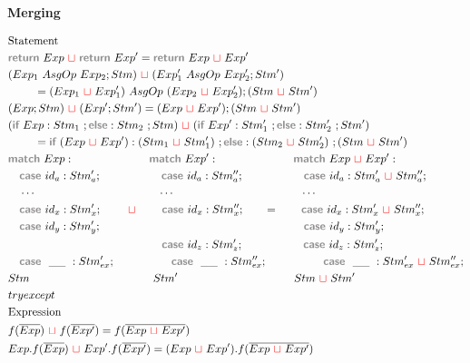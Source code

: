 \documentclass[11pt]{jarticle}
\newcommand{\gray}[1]{\textbf{\textsf{\color{Gray}#1}}}
\newcommand{\mg}{~{\color{red}{\sqcup}}~} %
\begin{document}
{\bf Merging}

\begin{align*}
  & \text{Statement}\\
  & \gray{return}~Exp \mg \gray{return}~Exp' = \gray{return}~Exp \mg Exp'\\
  & (Exp_1 ~AsgOp~ Exp_2 ; Stm) \mg (Exp'_1 ~AsgOp~ Exp'_2 ; Stm')\\
  & ~~~~~~~ = (Exp_1 \mg Exp'_1) ~AsgOp~ (Exp_2 \mg Exp'_2) ; (Stm \mg Stm')\\
  & (Exp ; Stm) \mg (Exp' ; Stm') = (Exp \mg Exp') ; (Stm \mg Stm')\\
  & (\gray{if}~Exp:Stm_1~;\gray{else}:Stm_2 ~;Stm) \mg (\gray{if}~Exp':Stm'_1~;\gray{else}:Stm'_2 ~;Stm')\\
  & ~~~~~~~ = \gray{if}~(Exp \mg Exp') : (Stm_1 \mg Stm'_1) ~; \gray{else} : (Stm_2 \mg Stm'_2) ~; (Stm \mg Stm')\\
  & \gray{match}~Exp: ~~~~~~~~~~~~~~~~~~~~\gray{match}~Exp': ~~~~~~~~~~~~~~~~~~~~\gray{match}~Exp \mg Exp':\\
  & ~~~\gray{case}~id_a : Stm'_a; ~~~~~~~~~~~~~~~~\gray{case}~id_a : Stm''_a; ~~~~~~~~~~~~~~~~\gray{case}~id_a : Stm'_a \mg Stm''_a;\\
  & ~~~\cdots ~~~~~~~~~~~~~~~~~~~~~~~~~~~~~~~~~\cdots ~~~~~~~~~~~~~~~~~~~~~~~~~~~~~~~~~~\cdots\\
  & ~~~\gray{case}~id_x : Stm'_x; ~~~~~~\mg~~~~~~\gray{case}~id_x : Stm''_x; ~~~~~~=~~~~~~\gray{case}~id_x : Stm'_x \mg Stm''_x;\\
  & ~~~\gray{case}~id_y : Stm'_y; ~~~~~~~~~~~~~~~~~~~~~~~~~~~~~~~~~~~~~~~~~~~~~~~~~~~~~~\gray{case}~id_y : Stm'_y; \\
  & ~~~~~~~~~~~~~~~~~~~~~~~~~~~~~~~~~~~~~~~~~\gray{case}~id_z : Stm'_z;~~~~~~~~~~~~~~~~\gray{case}~id_z : Stm'_z;\\
  & ~~~\gray{case}~~\_\_ ~: Stm'_{ex}; ~~~~~~~~~~~~~~~\gray{case}~~\_\_ ~: Stm''_{ex}; ~~~~~~~~~~~~~~~\gray{case}~~\_\_ ~:Stm'_{ex} \mg Stm''_{ex};\\
  & Stm ~~~~~~~~~~~~~~~~~~~~~~~~~~~~~~~~~ Stm' ~~~~~~~~~~~~~~~~~~~~~~~~~~~~~~~ Stm \mg Stm'\\
  & try except\\
  & \text{Expression}\\
  & f(\overline{Exp}) \mg f(\overline{Exp'}) = f(\overline{Exp \mg Exp'})\\
  & Exp.f(\overline{Exp}) \mg Exp'.f(\overline{Exp'}) = (Exp \mg Exp').f(\overline{Exp \mg Exp'})
\end{align*}
\end{document}
